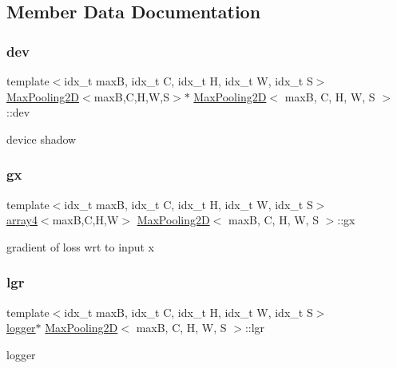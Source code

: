 \subsection{Member Data Documentation}
\mbox{\label{structMaxPooling2D_ad21014604fa6abddbfdcdc0b64f37196}} 
\subsubsection{\texorpdfstring{dev}{dev}}
{\footnotesize\ttfamily template$<$idx\+\_\+t maxB, idx\+\_\+t C, idx\+\_\+t H, idx\+\_\+t W, idx\+\_\+t S$>$ \\
\hyperlink{structMaxPooling2D}{Max\+Pooling2D}$<$maxB,C,H,W,S$>$$\ast$ \hyperlink{structMaxPooling2D}{Max\+Pooling2D}$<$ maxB, C, H, W, S $>$\+::dev}

device shadow \mbox{\label{structMaxPooling2D_abf5754c5b154e54b09c38bc2c189562b}} 
\subsubsection{\texorpdfstring{gx}{gx}}
{\footnotesize\ttfamily template$<$idx\+\_\+t maxB, idx\+\_\+t C, idx\+\_\+t H, idx\+\_\+t W, idx\+\_\+t S$>$ \\
\hyperlink{structarray4}{array4}$<$maxB,C,H,W$>$ \hyperlink{structMaxPooling2D}{Max\+Pooling2D}$<$ maxB, C, H, W, S $>$\+::gx}

gradient of loss wrt to input x \mbox{\label{structMaxPooling2D_a516ea469a544d99543c9073bc318f970}} 
\subsubsection{\texorpdfstring{lgr}{lgr}}
{\footnotesize\ttfamily template$<$idx\+\_\+t maxB, idx\+\_\+t C, idx\+\_\+t H, idx\+\_\+t W, idx\+\_\+t S$>$ \\
\hyperlink{structlogger}{logger}$\ast$ \hyperlink{structMaxPooling2D}{Max\+Pooling2D}$<$ maxB, C, H, W, S $>$\+::lgr}

logger \mbox{\label{structMaxPooling2D_ac6ca7dc8ceca1e9e5d2403634ebd8802}} 
